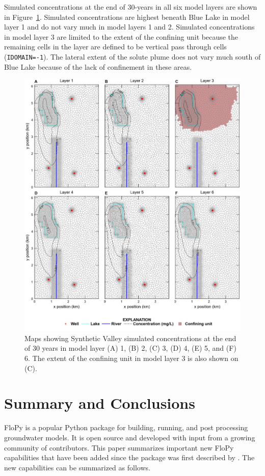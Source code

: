 \documentclass[11pt, oneside]{article}  	%
\begin{document}
Simulated concentrations at the end of 30-years in all six model layers are shown in Figure~\ref{fig:mvxsection}. Simulated concentrations are highest beneath Blue Lake in model layer 1 and do not vary much in model layers 1 and 2. Simulated concentrations in model layer 3 are limited to the extent of the confining unit because the remaining cells in the layer are defined to be vertical pass through cells (\texttt{IDOMAIN=-1}). The lateral extent of the solute plume does not vary much south of Blue Lake because of the lack of confinement in these areas.

\begin{figure}[ht!]
	\begin{center}
		\includegraphics{figures/mv_voronoi_map_concentration.png}
	\end{center}
	\caption{Maps showing Synthetic Valley simulated concentrations at the end of 30 years in model layer (A) 1, (B) 2, (C) 3, (D) 4, (E) 5, and (F) 6. The extent of the confining unit in model layer 3 is also shown on (C).}
	\label{fig:mvxsection}
\end{figure}

\section{Summary and Conclusions}
FloPy is a popular Python package for building, running, and post processing groundwater models. It is open source and developed with input from a growing community of contributors. This paper summarizes important new FloPy capabilities that have been added since the package was first described by \citep{bakker2016scripting}. The new capabilities can be summarized as follows.
\end{document}

